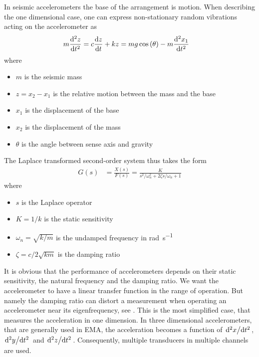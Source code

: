 In seismic accelerometers the base of the arrangement is motion. When describing the one dimensional case, one can express non-stationary random vibrations acting on the accelerometer as
\begin{align}
  m\dv[2]{z}{t} &= c\dv{z}{t} + kz = mg\cos\pqty{\theta}-m\dv[2]{x_1}{t}
\end{align}
where
\begin{itemize}
  \item $m$ is the seismic mass
  \item $z=x_2-x_1$ is the relative motion between the mass and the base
  \item $x_1$ is the displacement of the base
  \item $x_2$ is the displacement of the mass
  \item $\theta$ is the angle between sense axis and gravity
\end{itemize}
The Laplace transformed second-order system thus takes the form
\begin{align}
  G(s) &= \frac{X(s)}{F(s)} = \frac{K}{s^2/\omega_n^2 + 2\zeta s/\omega_n + 1 \label{eqn:acceler_dynamics}}
\end{align}
where
\begin{itemize}
  \item $s$ is the Laplace operator
  \item $K=1/k$ is the static sensitivity
  \item $\omega_n=\sqrt{k/m}$ is the undamped frequency in \si{\radian\per\second}
  \item $\zeta=c/2\sqrt{km}$ is the damping ratio
\end{itemize}
It is obvious that the performance of accelerometers depends on their static sensitivity, the natural frequency and the damping ratio. We want the accelerometer to have a linear transfer function in the range of operation. But namely the damping ratio can distort a measurement when operating an accelerometer near its eigenfrequency, see .
This is the most simplified case, that measures the acceleration in one dimension. In three dimensional accelerometers, that are generally used in \ac{EMA}, the acceleration becomes a function of $\dv*[2]{x}{t}$, $\dv*[2]{y}{t}$ and $\dv*[2]{z}{t}$. Consequently, multiple transducers in multiple channels are used.


